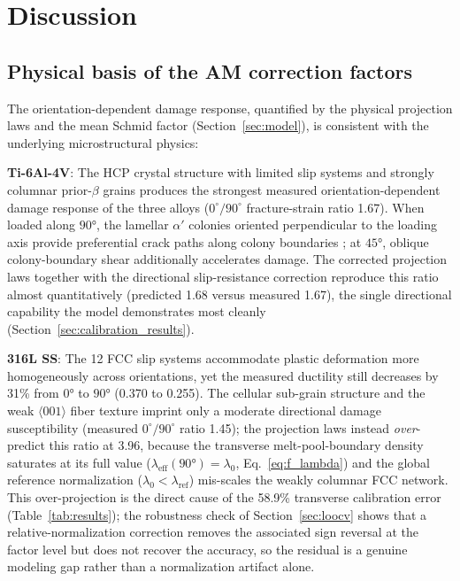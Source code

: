 \documentclass[twocolumn]{sagej}
\begin{document}
\section{Discussion}
\label{sec:discussion}


\subsection{Physical basis of the AM correction factors}
\label{sec:phys_basis}

The orientation-dependent damage response, quantified by the physical projection laws and the mean Schmid factor (Section~\ref{sec:model}), is consistent with the underlying microstructural physics:

\textbf{Ti-6Al-4V}: The HCP crystal structure with limited slip systems and strongly columnar prior-$\beta$ grains produces the strongest measured orientation-dependent damage response of the three alloys ($0^\circ/90^\circ$ fracture-strain ratio 1.67). When loaded along $\ang{90}$, the lamellar $\alpha'$ colonies oriented perpendicular to the loading axis provide preferential crack paths along colony boundaries \cite{carroll2015anisotropic}; at $\ang{45}$, oblique colony-boundary shear additionally accelerates damage. The corrected projection laws together with the directional slip-resistance correction reproduce this ratio almost quantitatively (predicted 1.68 versus measured 1.67), the single directional capability the model demonstrates most cleanly (Section~\ref{sec:calibration_results}).

\textbf{316L SS}: The 12 FCC slip systems accommodate plastic deformation more homogeneously across orientations, yet the measured ductility still decreases by 31\% from $\ang{0}$ to $\ang{90}$ (0.370 to 0.255). The cellular sub-grain structure and the weak $\langle001\rangle$ fiber texture imprint only a moderate directional damage susceptibility (measured $0^\circ/90^\circ$ ratio 1.45); the projection laws instead \emph{over}-predict this ratio at 3.96, because the transverse melt-pool-boundary density saturates at its full value ($\lambda_{\mathrm{eff}}(\ang{90})=\lambda_0$, Eq.~\eqref{eq:f_lambda}) and the global reference normalization ($\lambda_0<\lambda_{\mathrm{ref}}$) mis-scales the weakly columnar FCC network. This over-projection is the direct cause of the 58.9\% transverse calibration error (Table~\ref{tab:results}); the robustness check of Section~\ref{sec:loocv} shows that a relative-normalization correction removes the associated sign reversal at the factor level but does not recover the accuracy, so the residual is a genuine modeling gap rather than a normalization artifact alone.
\end{document}
